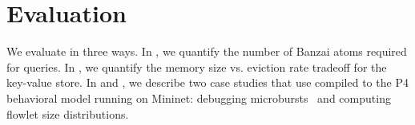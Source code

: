\section{Evaluation}
\label{sec:eval}

We evaluate \TheSystem in three ways. In , we quantify the
number of Banzai atoms required for \TheSystem queries. In ,
we quantify the memory size vs. eviction rate tradeoff for the key-value store.
In  and , we describe two case
studies that use \TheSystem compiled to the P4 behavioral model running on
Mininet: debugging microbursts~\cite{tpp} and computing flowlet size
distributions.






